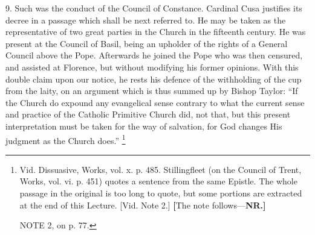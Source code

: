9. Such was the conduct of the Council of Constance. Cardinal Cusa
justifies its decree in a passage which shall be next referred to. He
may be taken as the representative of two great parties in the Church
in the fifteenth century. He was present at the Council of Basil,
being an upholder of the rights of a General Council above the
Pope. Afterwards he joined the Pope who was then censured, and
assisted at Florence, but without modifying his former opinions. With
this double claim upon our notice, he rests his defence of the
withholding of the cup from the laity, on an argument which is thus
summed up by Bishop Taylor: ``If the Church do expound any
evangelical sense contrary to what the current sense and practice of
the Catholic Primitive Church did, not that, but this present
interpretation must be taken for the way of salvation, for God changes
His judgment as the Church does.'' \footnote{Vid. Dissuasive, Works, vol. x. p. 485.
Stillingfleet (on the Council of Trent, Works, vol. vi. p. 451) quotes
a sentence from the same Epistle. The whole passage in the original is
too long to quote, but some portions are extracted at the end of this
Lecture. [Vid. Note 2.] \textbf{[}The note follows—\textbf{NR.}\textbf{]}

NOTE
2, on p. 77.

}
